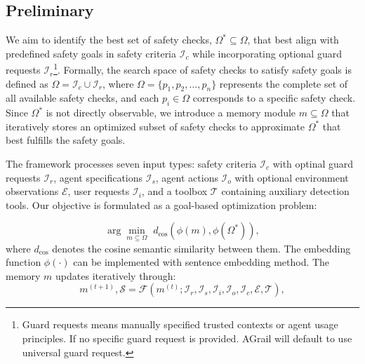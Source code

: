 





\subsection{Preliminary}
We aim to identify the best set of safety checks, \(\Omega^{*} \subseteq \Omega\), that best align with predefined safety goals in safety criteria \(\mathcal{I}_c\) while incorporating optional guard requests \(\mathcal{I}_r\)\footnote{Guard requests means manually specified trusted contexts or agent usage principles. If no specific guard request is provided. AGrail will default to use universal guard request.}. Formally, the search space of safety checks to satisfy safety goals is defined as \(\Omega = \mathcal{I}_c \cup \mathcal{I}_r\), where \(\Omega = \{ p_1, p_2, \dots, p_n \}\) represents the complete set of all available safety checks, and each \(p_i \in \Omega\) corresponds to a specific safety check. Since \(\Omega^{*}\) is not directly observable, we introduce a memory module \(m \subseteq \Omega\) that iteratively stores an optimized subset of safety checks to approximate \(\Omega^{*}\) that best fulfills the safety goals.

The framework processes seven input types: safety criteria \(\mathcal{I}_c\) with optinal guard requests \(\mathcal{I}_r\), agent specifications \(\mathcal{I}_s\), agent actions \(\mathcal{I}_o\) with optional environment observations \(\mathcal{E}\), user requests \(\mathcal{I}_i\), and a toolbox \(\mathcal{T}\) containing auxiliary detection tools. Our objective is formulated as a goal-based optimization problem:

\[
    \arg\min_{m \subseteq \Omega} \,\, d_{\text{cos}}\left(\phi(m), \phi(\Omega^{*})\right),
\]
\noindent
where \(d_{\text{cos}}\) denotes the cosine semantic similarity between them. The embedding function \(\phi(\cdot)\) can be implemented with sentence embedding method. The memory \(m\) updates iteratively through:
\begin{equation*}
    m^{(t+1)}, \mathcal{S} = \mathcal{F}\left(m^{(t)}; \mathcal{I}_r, \mathcal{I}_s, \mathcal{I}_i, \mathcal{I}_o, \mathcal{I}_c, \mathcal{E}, \mathcal{T}\right),
\end{equation*}

